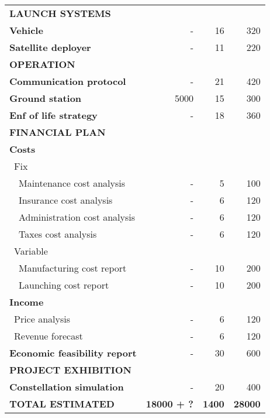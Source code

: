 \documentclass[11pt,a4paper]{article}
\begin{document}
\begin{longtable}{| l | r | r |r | }
\rowcolor[gray]{0.85} \textbf{LAUNCH SYSTEMS} & &  &   \\
	
	\textbf{Vehicle} & - & 16 & 320 \\
	\hline
	\textbf{Satellite deployer} & - & 11 & 220  \\

	
\rowcolor[gray]{0.85} \textbf{OPERATION} & &  &  \\
	
	\textbf{Communication protocol} & - & 21 & 420 \\
	\hline
	\textbf{Ground station} & 5000 & 15 & 300 \\
	\hline
	\textbf{Enf of life strategy} & - & 18  & 360 \\
	\hline

\pagebreak

	\hline
\rowcolor[gray]{0.85} \textbf{FINANCIAL PLAN} & &  & \\
	
	\textbf{Costs} & & & \\
	   \blue ~Fix & &  &   \\
	   ~~Maintenance cost analysis & - & 5 & 100 \\
	   ~~Insurance cost analysis & - & 6 & 120 \\
	   ~~Administration cost analysis & - & 6 & 120 \\
	   ~~Taxes cost analysis & - & 6 & 120 \\
	   \blue ~Variable & &  & \\
	   ~~Manufacturing cost report & - & 10 & 200 \\
	   ~~Launching cost report & - & 10 & 200 \\
	\hline
	\textbf{Income} & & &  \\
	   \blue ~Price analysis & - & 6  & 120  \\
	   \blue ~Revenue forecast & - & 6  & 120  \\
	\hline
	\textbf{Economic feasibility report} & - & 30 & 600 \\

\rowcolor[gray]{0.85} \textbf{PROJECT EXHIBITION} & & &  \\

	\textbf{Constellation simulation} & - & 20 & 400 \\

\rowcolor[gray]{0.65} \textbf{TOTAL ESTIMATED} & \textbf{18000 + ?} & \textbf{1400} & \textbf{28000} \\
    \hline

\end{longtable}
\end{document}
